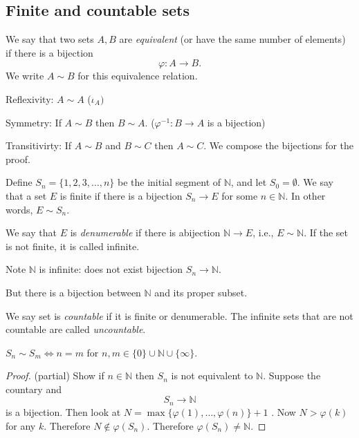 
\subsection{Finite and countable sets}
\begin{definition}
	We say that two sets $A,B$ are \textit{equivalent} (or have the same number of elements) if there is a bijection \[
	\varphi : A\to B
.\] We write $A\sim B$ for this equivalence relation.

\end{definition}

\begin{proposition}
	Reflexivity: $A\sim A$ ($\iota_A)$

	Symmetry: If $A\sim B$ then $B\sim A$. ($\varphi^{-1}:B\to A$ is a bijection)

	Transitivirty: If $A\sim B$ and $B\sim C$ then $A\sim C$. We compose the bijections for the proof.
\end{proposition}


Define $S_n = \{1,2,3,\ldots,n\} $ be the initial segment of $\mathbb{N}$, and let $S_0 = \emptyset $. We say that a set $E$ is finite if there is a bijection $  S_n\to E$ for some $n \in \mathbb{N}$. In other words, $E \sim S_n$.

We say that $E$ is \textit{denumerable} if there is abijection $\mathbb{N}\to E$, i.e., $E\sim \mathbb{N}$. If the set is not finite, it is called infinite. 


Note $\mathbb{N}$ is infinite: does not exist bijection $S_n \to \mathbb{N}$.

But there is a bijection between $\mathbb{N}$ and its proper subset.

We say set is \textit{countable} if it is finite or denumerable. The infinite sets that are not countable are called \textit{uncountable}.

\begin{proposition}
	$S_{n}\sim S_m \iff n = m$ for $n, m \in \{0\} \cup \mathbb{N}\cup \{\infty \} $.
\end{proposition}
\begin{proof}
	(partial) Show if $n \in \mathbb{N}$ then $S_n$ is not equivalent to $\mathbb{N}$. Suppose the countary and \[
		S_n \to \mathbb{N}
	\]
	is a bijection. Then look at $N = \max \{\varphi(1), \ldots, \varphi(n)\} + 1$ . Now  $N > \varphi(k)$ for any $k$. Therefore $N \not\in \varphi(S_n)$. Therefore $\varphi(S_n) \neq  \mathbb{N}$.
\end{proof}

